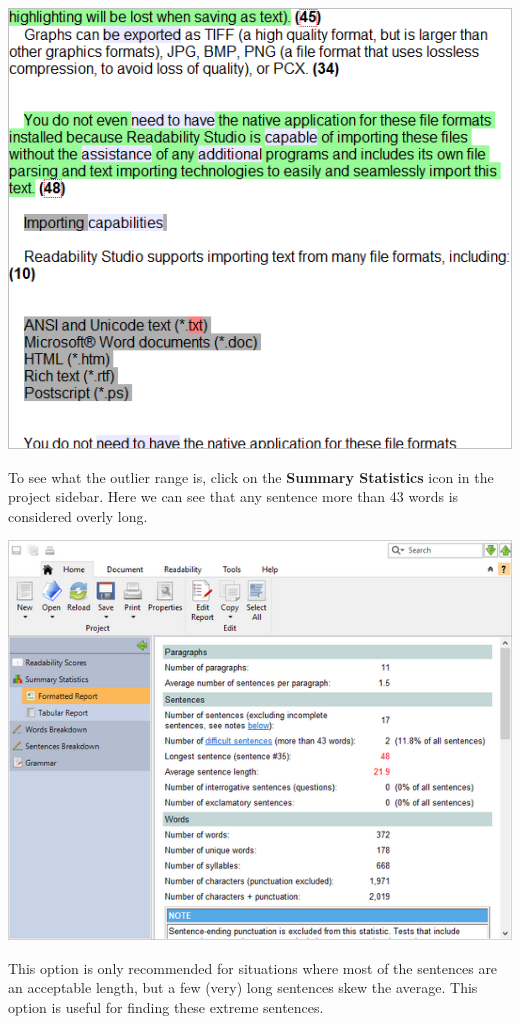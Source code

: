 \documentclass[
]{book}
\theoremstyle{definition}
\theoremstyle{definition}
\theoremstyle{definition}
\theoremstyle{definition}
\theoremstyle{remark}
\begin{document}
\includegraphics{Images/featuressentencesoutliers.png}

To see what the outlier range is, click on the \textbf{Summary Statistics} icon in the project sidebar. Here we can see that any sentence more than 43 words is considered overly long.

\includegraphics{Images/featuressentences43.png}

This option is only recommended for situations where most of the sentences are an acceptable length, but a few (very) long sentences skew the average. This option is useful for finding these extreme sentences.
\end{document}

